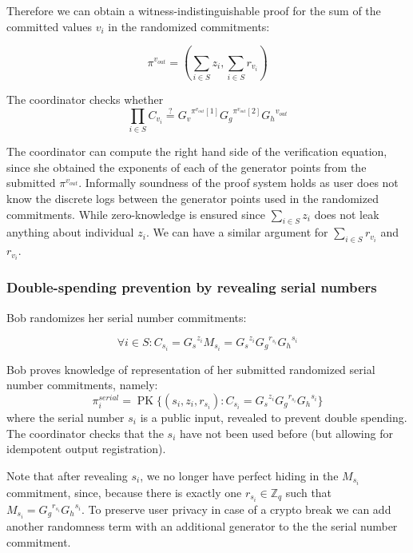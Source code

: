 \documentclass{article}
\begin{document}
Therefore we can obtain a witness-indistinguishable proof for the sum of the committed values $v_i$ in the randomized commitments:

\[ \pi^{v_{out}}=\left(\sum_{i \in S}z_i,\sum_{i \in S}r_{v_i}\right) \]

The coordinator checks whether
\[
\prod_{i \in S} C_{v_i}
\stackrel{?}{=}
{G_v}^{\pi^{v_{out}}[1]} {G_g}^{\pi^{v_{out}}[2]} {G_h}^{v_{\mathit{out}}}
\]

The coordinator can compute the right hand side of the verification equation, since she obtained the exponents of each of the generator points from the submitted $\pi^{v_{out}}$. Informally soundness of the proof system holds as user does not know the discrete logs between the generator points used in the randomized commitments. While zero-knowledge is ensured since $\sum_{i \in S}z_i$ does not leak anything about individual $z_i$. We can have a similar argument for $\sum_{i \in S}r_{v_i}$ and $r_{v_i}$.

\subsubsection{Double-spending prevention by revealing serial numbers}

Bob randomizes her serial number commitments:

\[ \forall i \in S: C_{{s_i}}={G_s}^{z_i}M_{s_i}={G_s}^{z_i}{G_g}^{r_{s_i}}{G_h}^{s_i} \]

Bob proves knowledge of representation of her submitted randomized serial number commitments, namely:
\[
\pi_{i}^{\mathit{serial}}=\operatorname{PK}\{ (s_i, z_i, r_{s_i}):C_{s_i} = {G_s}^{z_i}{G_g}^{r_{s_i}}{G_h}^{s_i}
\}
\]
where the serial number $s_i$ is a public input, revealed to prevent double spending. The coordinator checks that the $s_i$ have not been used before (but allowing for idempotent output registration).

Note that after revealing $s_i$, we no longer have perfect hiding in the $M_{s_i}$ commitment, since, because there is exactly one $r_{s_i} \in \mathbb{Z}_q$ such that $M_{s_i} = {G_g}^{r_{s_i}} {G_h}^{s_i}$. To preserve user privacy in case of a crypto break we can add another randomness term with an additional generator to the the serial number commitment.



\end{document}
